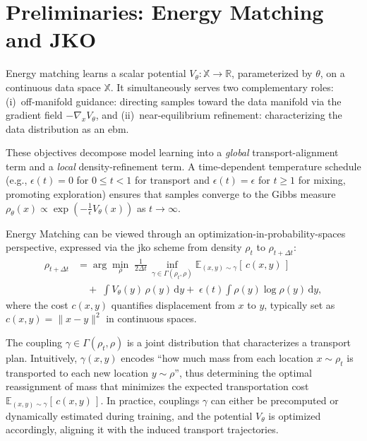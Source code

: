 \section{Preliminaries: Energy Matching and JKO }

Energy matching learns a scalar potential \( V_\theta:\mathbb{X}
\to\mathbb{R} \), parameterized by \(\theta\), on a continuous data space \(\mathbb{X}\). It simultaneously serves two complementary roles: (i)~off-manifold guidance: directing samples toward the data manifold via the gradient field \(-\nabla_x V_\theta\), and (ii)~near-equilibrium refinement: characterizing the data distribution as an \gls{ebm}.

These objectives decompose model learning into a \emph{global} transport-alignment term and a \emph{local} density-refinement term. A time-dependent temperature schedule (e.g., $\epsilon(t)=0$ for $0 \leq t < 1$ for transport and $\epsilon(t)=\epsilon$ for $t \geq 1$ for mixing, promoting exploration) ensures that samples converge to the Gibbs measure $\rho_{\theta}(x) \propto \exp(-\frac{1}{\epsilon} V_\theta(x))$ as $t \to \infty$.

Energy Matching can be viewed through an optimization-in-probability-spaces perspective, expressed via the \gls{jko} scheme from density $\rho_t$ to $\rho_{t+\Delta t}$:
\begin{align}
\label{jko_em}
\rho_{t+\Delta t}
&=
\arg\min_{\rho}\;
\frac{1}{2\Delta t}\,\inf_{\gamma\in\Gamma(\rho_t,\rho)}\mathbb{E}_{(x,y)\sim\gamma}[\,c(x,y)\,]\nonumber\\
&\quad+\;\int V_\theta(y)\,\rho(y)\,\mathrm{d}y
+\;\epsilon(t)\int \rho(y)\log\rho(y)\,\mathrm{d}y,
\end{align}
where the cost \( c(x,y) \) quantifies displacement from \( x \) to \( y \), typically set as \( c(x,y)=\|x - y\|^2 \) in continuous spaces.

The coupling \(\gamma\in\Gamma(\rho_t,\rho)\) is a joint distribution that characterizes a transport plan. Intuitively, \(\gamma(x,y)\) encodes ``how much mass from each location \(x\sim\rho_t\) is transported to each new location \(y\sim\rho\)'', thus determining the optimal reassignment of mass that minimizes the expected transportation cost \(\mathbb{E}_{(x,y)\sim\gamma}[\,c(x,y)\,]\). In practice, couplings $\gamma$ can either be precomputed or dynamically estimated during training, and the potential $V_\theta$ is optimized accordingly, aligning it with the induced transport trajectories.


